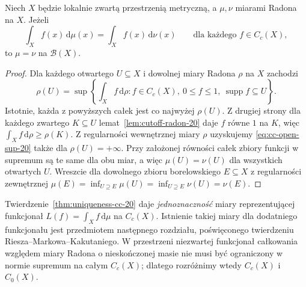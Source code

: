 \begin{twierdzenie}
\label{thm:uniqueness-cc-20}
Niech $X$ będzie lokalnie zwartą przestrzenią metryczną,
a $\mu,\nu$ miarami Radona na $X$. Jeżeli
\[
\int_X f(x)\,\mathrm d\mu(x)
=\int_Xf(x)\,\mathrm d\nu(x)
\qquad\text{dla każdego }f\in C_c(X),
\]
to $\mu=\nu$ na $\mathcal B(X)$.
\end{twierdzenie}
\begin{proof}
Dla każdego otwartego $U\subseteq X$ i dowolnej
miary Radona $\rho$ na $X$ zachodzi
\begin{equation}\label{eq:cc-open-sup-20}
\rho(U)=\sup\left\{\int_Xf\,\mathrm d\rho:
 f\in C_c(X),\ 0\le f\le1,\
 \operatorname{supp}f\subseteq U\right\}.
\end{equation}
Istotnie, każda z powyższych całek jest co najwyżej
$\rho(U)$. Z drugiej strony dla każdego zwartego
$K\subseteq U$ lemat~\ref{lem:cutoff-radon-20}
daje $f$ równe $1$ na $K$, więc
$\int_Xf\,\mathrm d\rho\ge\rho(K)$.
Z regularności wewnętrznej miary $\rho$
uzyskujemy \eqref{eq:cc-open-sup-20} także dla
$\rho(U)=+\infty$. Przy założonej równości całek
zbiory funkcji w supremum są te same dla obu miar,
a więc $\mu(U)=\nu(U)$ dla wszystkich otwartych $U$.
Wreszcie dla dowolnego zbioru borelowskiego
$E\subseteq X$ z regularności zewnętrznej
$\mu(E)=\inf_{U\supseteq E}\mu(U)
=\inf_{U\supseteq E}\nu(U)=\nu(E)$.
\end{proof}

\begin{uwaga}
Twierdzenie~\ref{thm:uniqueness-cc-20} daje
\emph{jednoznaczność} miary reprezentującej funkcjonał
$L(f)=\int_Xf\,\mathrm d\mu$ na $C_c(X)$.
Istnienie takiej miary dla dodatniego funkcjonału
jest przedmiotem następnego rozdziału, poświęconego
twierdzeniu Riesza--Markowa--Kakutaniego. W przestrzeni
niezwartej funkcjonał całkowania względem miary
Radona o nieskończonej masie nie musi być ograniczony
w normie supremum na całym $C_c(X)$; dlatego rozróżnimy
wtedy $C_c(X)$ i $C_0(X)$.
\end{uwaga}

